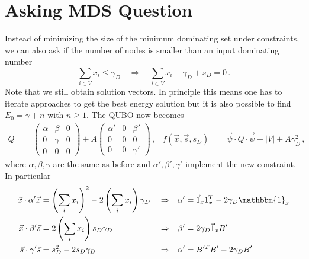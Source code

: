 \documentclass[]{article}
\begin{document}
\section{Asking MDS Question}
Instead of minimizing the size of the minimum dominating set under constraints, we can also ask if the number of nodes is smaller than an input dominating number
\begin{equation}
	\sum_{i \in V} x_i \leq \gamma_D \quad \Rightarrow \quad \sum_{i \in V} x_i - \gamma_D + s_D = 0 \, .
\end{equation}
Note that we still obtain solution vectors.
In principle this means one has to iterate approaches to get the best energy solution but it is also possible to find $E_0 = \gamma + n$ with $n\geq1$.
The QUBO now becomes
\begin{align}\label{mds2:qubo}
	Q &= 
	\begin{pmatrix}\alpha & \beta & 0 \\ 0 & \gamma & 0 \\ 0 & 0 & 0 \end{pmatrix}
	+
	A \begin{pmatrix}\alpha' & 0 & \beta' \\ 0 & 0 & 0 \\ 0 & 0 & \gamma' \end{pmatrix}
	\, , & 
	f(\vec x, \vec s, s_D)
	&=
	\vec \psi \cdot Q \cdot \vec \psi + |V| + A \gamma_D^2
	\, ,
\end{align}
where $\alpha, \beta, \gamma$ are the same as before and $\alpha', \beta', \gamma'$ implement the new constraint.
In particular 
\begin{align}
	\vec x \cdot \alpha' \vec x &= \left(\sum_i x_i\right)^2 - 2 \left(\sum_i x_i\right) \gamma_D 
	&& \Rightarrow &
	\alpha' &= \vec 1_x \vec 1_x^T - 2 \gamma_D \mathbbm{1}_x
	\\
	\vec x \cdot \beta' \vec s &= 2 \left(\sum_i x_i\right) s_D \gamma_D 
	&& \Rightarrow &
	\beta' &= 2 \gamma_D \vec 1_x B'
	\\
	\vec s \cdot \gamma' \vec s &= s_D^2 - 2 s_D \gamma_D 
	&& \Rightarrow &
	\alpha' &= B'^T B' - 2 \gamma_D B'
	\\
\end{align}
\end{document}
